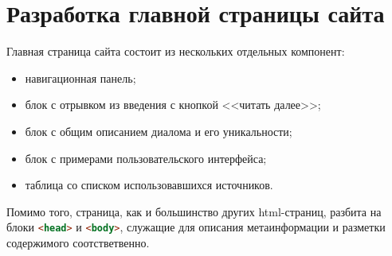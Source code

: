 \section{Разработка главной страницы сайта}
\label{sec:practice}

Главная страница сайта состоит из нескольких отдельных компонент:
\begin{itemize}
	\item навигационная панель;
	\item блок с отрывком из введения с кнопкой <<читать далее>>;
	\item блок с общим описанием диалома и его уникальности;
	\item блок с примерами пользовательского интерфейса;
	\item таблица со списком использовавшихся источников.
\end{itemize}

Помимо того, страница, как и большинство других \gls{html}-страниц, разбита на блоки \lstinline[language=HTML]{<head>} и \lstinline[language=HTML]{<body>}, служащие для описания метаинформации и разметки содержимого соотстветвенно.